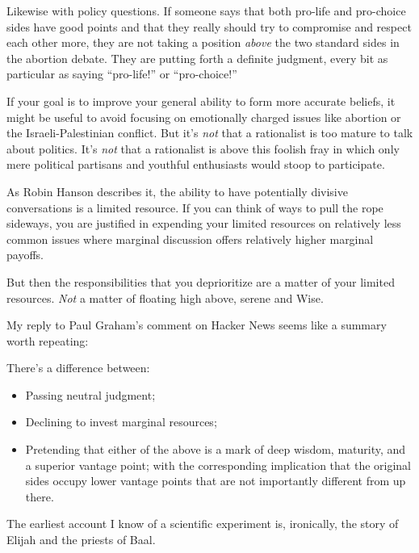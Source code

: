 {
 Likewise with policy questions. If someone says that both pro-life
and pro-choice sides have good points and that they really should try
to compromise and respect each other more, they are not taking a
position \textit{above} the two standard sides in the abortion debate.
They are putting forth a definite judgment, every bit as particular as
saying ``pro-life!'' or
``pro-choice!''}

{
 If your goal is to improve your general ability to form more
accurate beliefs, it might be useful to avoid focusing on emotionally
charged issues like abortion or the Israeli-Palestinian conflict. But
it's \textit{not} that a rationalist is too mature to
talk about politics. It's \textit{not} that a
rationalist is above this foolish fray in which only mere political
partisans and youthful enthusiasts would stoop to participate.}

{
 As Robin Hanson describes it, the ability to have potentially
divisive conversations is a limited resource. If you can think of ways
to pull the rope sideways, you are justified in expending your limited
resources on relatively less common issues where marginal discussion
offers relatively higher marginal payoffs.}

{
 But then the responsibilities that you deprioritize are a matter
of your limited resources. \textit{Not} a matter of floating high
above, serene and Wise.}

{
 My reply to Paul Graham's comment on Hacker News
seems like a summary worth repeating:}

{
 There's a difference between:}

\begin{itemize}
\item {
 Passing neutral judgment;}

\item {
 Declining to invest marginal resources;}

\item {
 Pretending that either of the above is a mark of deep wisdom,
maturity, and a superior vantage point; with the corresponding
implication that the original sides occupy lower vantage points that
are not importantly different from up there.}
\end{itemize}

\myendsectiontext


\bigskip


{
 The earliest account I know of a scientific experiment is,
ironically, the story of Elijah and the priests of Baal. }

